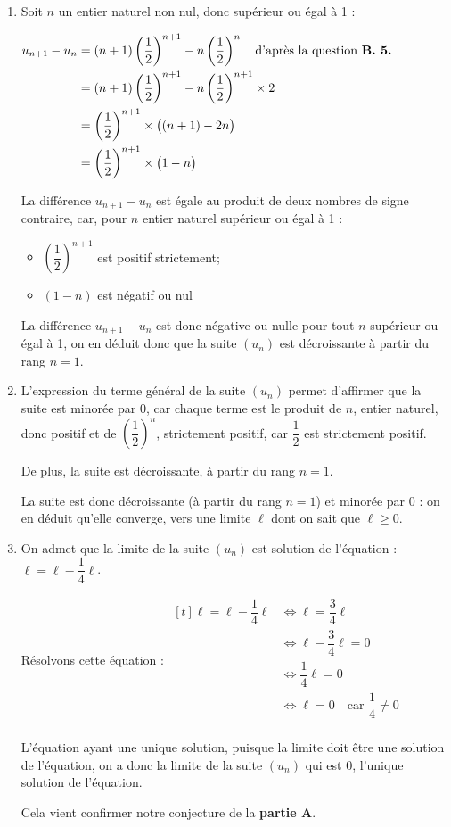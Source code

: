\begin{enumerate}
\item Soit $n$ un entier naturel non nul, donc supérieur ou égal à 1 :

$\begin{aligned}
			u_{n+1} - u_n &= (n+1)\left(\dfrac{1}{2}\right)^{n+1} - n\left(\dfrac{1}{2}\right)^{n}\quad \text{d'après la question \textbf{B. 5.}}\\
	&= (n+1)\left(\dfrac{1}{2}\right)^{n+1} - n\left(\dfrac{1}{2}\right)^{n+1} \times 2\\
	&= \left(\dfrac{1}{2}\right)^{n+1} \times\big((n+1) -2n \big) \\
	&= \left(\dfrac{1}{2}\right)^{n+1} \times\big(1-n\big) \\
\end{aligned}$

La différence $u_{n+1} - u_n$ est égale au produit de deux nombres de signe contraire, car, pour $n$ entier naturel supérieur ou égal à 1 :
\begin{itemize}
			\item $\left(\dfrac{1}{2}\right)^{n+1}$ est positif strictement;
			\item $(1 - n)$ est négatif ou nul
\end{itemize}

La différence $u_{n+1} - u_n$ est donc négative ou nulle pour tout $n$ supérieur ou égal à 1, on en déduit donc que la suite $(u_{n})$ est décroissante à partir du rang $n=1$.

\item L'expression du terme général de la suite $(u_n)$ permet d'affirmer que la suite est minorée par 0, car chaque terme est le produit de $n$, entier naturel, donc positif et de $\left(\dfrac{1}{2}\right)^{n}$, strictement positif, car $\dfrac{1}{2}$ est strictement positif.

De plus, la suite est décroissante, à partir du rang $n= 1$.

La suite est donc décroissante (à partir du rang $n=1$) et minorée par 0 : on en déduit qu'elle converge, vers une limite $\ell$ dont on sait que $\ell \geqslant0$.

\item On admet que la limite de la suite $\left(u_{n}\right)$ est solution de l'équation : $\ell=\ell-\dfrac{1}{4} \ell$.

Résolvons cette équation :\quad 
$\begin{aligned}[t]
	\ell=\ell-\dfrac{1}{4} \ell
	&\iff \ell = \dfrac{3}{4}\ell\\
	&\iff \ell - \dfrac{3}{4}\ell = 0\\
	&\iff \dfrac{1}{4}\ell = 0\\
	&\iff \ell = 0\quad \text{car } \dfrac{1}{4}\neq 0\\
\end{aligned}$

L'équation ayant une unique solution, puisque la limite doit être une solution de l'équation, on a donc la limite de la suite $\left(u_{n}\right)$ qui est 0, l'unique solution de l'équation.

Cela vient confirmer notre conjecture de la \textbf{partie A}.
	\end{enumerate}
